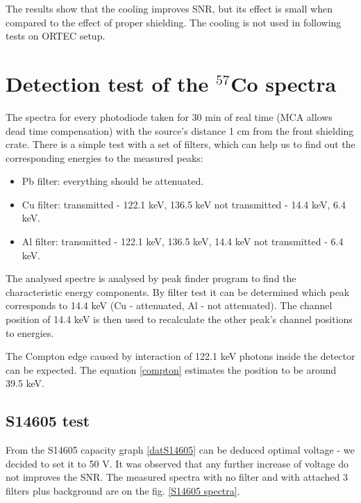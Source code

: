 \par
The results show that the cooling improves SNR, but its effect is small when compared to the effect of proper shielding. The cooling is not used in following tests on ORTEC setup.

\section{Detection test of the $^{57}$Co spectra}
The spectra for every photodiode taken for 30 min of real time (MCA allows dead time compensation) with the source's distance 1 cm from the front shielding crate. There is a simple test with a set of filters, which can help us to find out the corresponding energies to the measured peaks:

\begin{itemize}
\item Pb filter: everything should be attenuated.
\item Cu filter: transmitted - 122.1 keV, 136.5 keV not transmitted - 14.4 keV, 6.4 keV.
\item Al filter: transmitted - 122.1 keV, 136.5 keV, 14.4 keV not transmitted - 6.4 keV.
\end{itemize}

The analysed spectre is analysed by peak finder program to find the characteristic energy components. By filter test it can be determined which peak corresponds to 14.4 keV (Cu - attenuated, Al - not attenuated). The channel position of 14.4 keV is then used to recalculate the other peak's channel positions to energies.
\par
The Compton edge caused by interaction of 122.1 keV photons inside the detector can be expected. The equation \ref{compton} estimates the position to be around 39.5 keV. 

\subsection{S14605 test}
From the S14605 capacity graph \ref{datS14605} can be deduced optimal voltage - we decided to set it to 50 V. It was observed that any further increase of voltage do not improves the SNR. The measured spectra with no filter and with attached 3 filters plus background are on the fig. \ref{S14605 spectra}.


